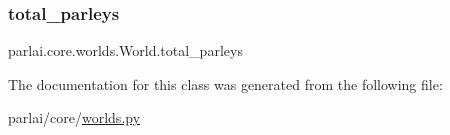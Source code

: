 \subsubsection{\texorpdfstring{total\+\_\+parleys}{total\_parleys}}
{\footnotesize\ttfamily parlai.\+core.\+worlds.\+World.\+total\+\_\+parleys}



The documentation for this class was generated from the following file\+:\begin{DoxyCompactItemize}
\item 
parlai/core/\hyperlink{parlai_2core_2worlds_8py}{worlds.\+py}\end{DoxyCompactItemize}
